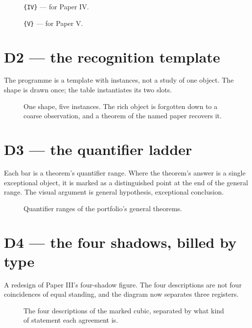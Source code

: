 \documentclass[11pt]{article}
\begin{document}
\begin{figure}[H]
\centering
{}
\caption{\texttt{\string\ClebschSeriesMap\{IV\}} --- for Paper IV.}
\end{figure}

\clearpage
\begin{figure}[H]
\centering
{}
\caption{\texttt{\string\ClebschSeriesMap\{V\}} --- for Paper V.}
\end{figure}

\clearpage
\section*{D2 --- the recognition template}

The programme is a template with instances, not a study of one object.
The shape is drawn once; the table instantiates its two slots.

\begin{figure}[H]
\centering
\ClebschRecognitionTemplate
\caption{One shape, five instances.  The rich object is forgotten down to
a coarse observation, and a theorem of the named paper recovers it.}
\end{figure}

\clearpage
\section*{D3 --- the quantifier ladder}

Each bar is a theorem's quantifier range.  Where the theorem's answer is a
single exceptional object, it is marked as a distinguished point at the end
of the general range.  The visual argument is general hypothesis,
exceptional conclusion.

\begin{figure}[H]
\centering
\ClebschQuantifierLadder
\caption{Quantifier ranges of the portfolio's general theorems.}
\end{figure}

\clearpage
\section*{D4 --- the four shadows, billed by type}

A redesign of Paper III's four-shadow figure.  The four descriptions are
not four coincidences of equal standing, and the diagram now separates
three registers.

\begin{figure}[H]
\centering
\ClebschFourShadows
\caption{The four descriptions of the marked cubic, separated by what kind
of statement each agreement is.}
\end{figure}
\end{document}
